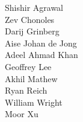 Shishir Agrawal\\
Zev Chonoles\\
Darij Grinberg\\
Aise Johan de Jong\\
Adeel Ahmad Khan\\
Geoffrey Lee\\
Akhil Mathew\\
Ryan Reich\\
William Wright\\
Moor Xu\\
